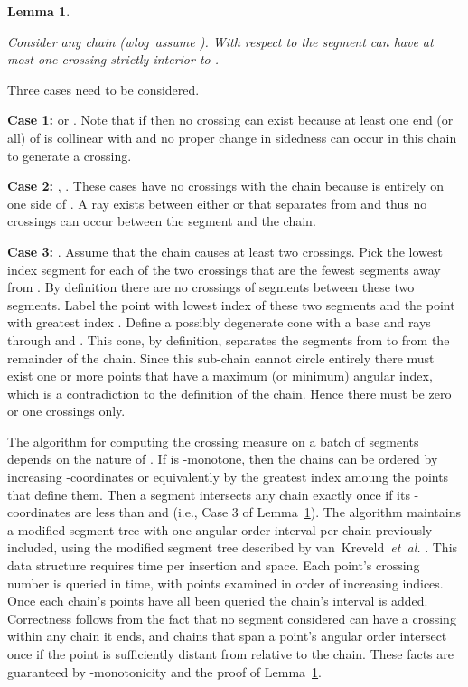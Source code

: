 \documentclass{article}
\newtheorem{lemma}[theorem]{Lemma}
\def\QED{\ensuremath{{\square}}}
\def\markatright#1{\leavevmode\unskip\nobreak\quad\hspace*{\fill}{#1}}
\newenvironment{proof}
  {\begin{trivlist}\item[\hskip\labelsep{\bf Proof.}]}
  {\markatright{\QED}\end{trivlist}}
\begin{document}
\begin{lemma}\label{lem:segmentcross}
	
Consider any chain  (wlog\ assume ). With respect
to  the segment  can have at most one crossing
strictly interior to .
	
\end{lemma}

\begin{proof} Three cases need to be considered.
	
{\bf Case 1:}  or . Note
that if  then no crossing can exist because at least one end (or all)
of  is collinear with  and no proper change in sidedness
can occur in this chain to generate a crossing.
		
{\bf Case 2:} , .  These
cases have no crossings with the chain because  is entirely on
one side of .  A ray exists
between either  or  that separates
 from  and thus no crossings can occur between the
segment and the chain.
		
{\bf Case 3:} .
Assume that the chain causes at least two crossings.  Pick the lowest index segment for each of the two crossings that are the fewest segments away from .
By definition there are no crossings of segments between these two segments.
Label the point with lowest index of these two segments  and
the point with greatest index .  Define a possibly degenerate cone  with a base  and rays through 
 and .  This cone, by definition, separates the segments from  to  from the remainder of the chain.  Since this sub-chain cannot circle  entirely there must exist one or more points that have a maximum (or minimum) angular index, which is a contradiction to the definition of the chain.  Hence there must be zero or one crossings only.\end{proof}
	
The algorithm for computing the crossing measure on a batch of segments
depends on the nature of .  If  is
-monotone, then the chains can be ordered by increasing -coordinates or
equivalently by the greatest index amoung the points that define them.  Then
a segment  intersects any chain  exactly once if
its -coordinates are less than  and  (i.e., Case 3 of
Lemma~\ref{lem:segmentcross}).  The algorithm maintains a modified segment
tree with one angular order interval per chain previously included, using
the modified segment tree described by van~Kreveld~\emph{et~al.}
\cite[p.~237]{berg:2008fk}.  This data structure requires  time
per insertion and  space.  Each point's crossing number is queried in
 time, with points examined in order of increasing indices. 
Once each chain's points have all been queried the chain's interval is
added.  Correctness follows from the fact that no segment considered
can have a crossing within any chain it ends, and chains that span a
point's angular order intersect once if the point is sufficiently distant
from  relative to the chain.  These facts are guaranteed by
-monotonicity and the proof of Lemma~\ref{lem:segmentcross}.
	
\end{document}
